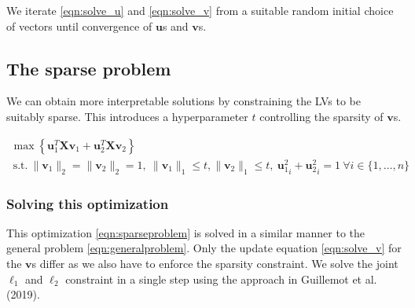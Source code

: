 \documentclass[10pt,a4paper]{article}
\begin{document}
 We iterate \eqref{eqn:solve_u} and \eqref{eqn:solve_v} from a suitable random initial choice of vectors until convergence of $\mathbf{u}$s and $\mathbf{v}$s.
 
\subsection*{The sparse problem}
We can obtain more interpretable solutions by constraining the LVs to be suitably sparse. This introduces a hyperparameter $t$ controlling the sparsity of $\mathbf{v}$s.

\begin{multline}
\max \left\{ \mathbf{u}_1^T \mathbf{X} \mathbf{v}_1 + \mathbf{u}_2^T \mathbf{X} \mathbf{v}_2\right\} \\~\textrm{s.t.}~ \|\mathbf{v}_1\|_2 = \|\mathbf{v}_2\|_2=1,~\|\mathbf{v}_1\|_1\leq t, \|\mathbf{v}_2\|_1\leq t,~ {\mathbf{u}_1^2}_i + {\mathbf{u}_2^2}_i = 1~ \forall i\in \{1,\ldots,n\}
\label{eqn:sparseproblem}
\end{multline}

\subsubsection*{Solving this optimization}
This optimization \eqref{eqn:sparseproblem} is solved in a similar manner to the general problem \eqref{eqn:generalproblem}. Only the update equation \eqref{eqn:solve_v} for the $\mathbf{v}$s differ as we also have to enforce the sparsity constraint. We solve the joint $\ell_1$ and $\ell_2$ constraint in a single step using the approach in Guillemot et al. (2019).
\end{document}
